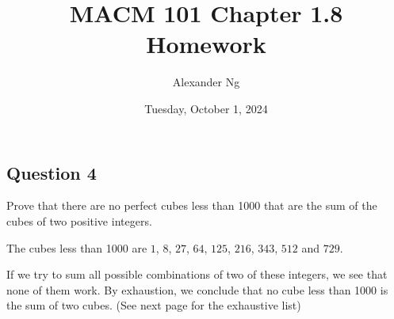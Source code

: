 \documentclass[12pt]{article}
\begin{document}
\title{MACM 101 Chapter 1.8 Homework}
\author{Alexander Ng}
\date{Tuesday, October 1, 2024}

\maketitle

\subsection*{Question 4}

Prove that there are no perfect cubes less than 1000 that are the sum of the
cubes of two positive integers. 

The cubes less than 1000 are $1$, $8$, $27$, $64$, $125$, $216$, $343$, $512$
and $729$.

If we try to sum all possible combinations of two of these integers, we see
that none of them work. By exhaustion, we conclude that no cube less than 1000
is the sum of two cubes. (See next page for the exhaustive list)

\pagebreak
\end{document}
